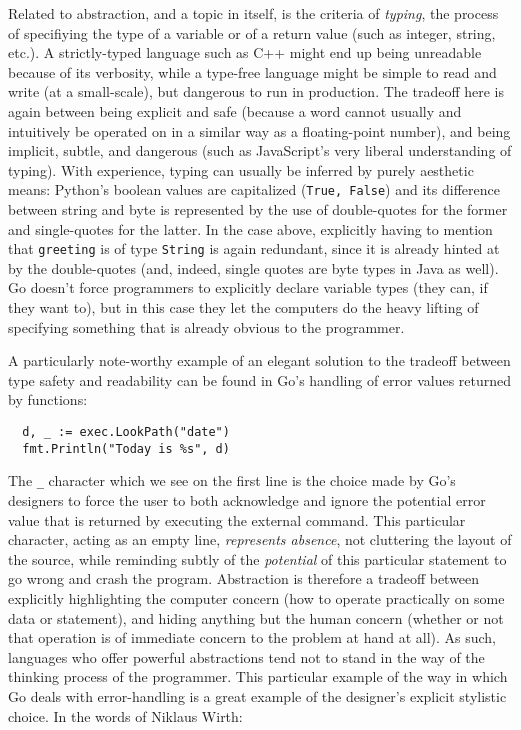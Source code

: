 \documentclass{article}
\begin{document}
Related to abstraction, and a topic in itself, is the criteria of \emph{typing}, the process of specifiying the type of a variable or of a return value (such as integer, string, etc.). A strictly-typed language such as C++ might end up being unreadable because of its verbosity, while a type-free language might be simple to read and write (at a small-scale), but dangerous to run in production. The tradeoff here is again between being explicit and safe (because a word cannot usually and intuitively be operated on in a similar way as a floating-point number), and being implicit, subtle, and dangerous (such as JavaScript's very liberal understanding of typing). With experience, typing can usually be inferred by purely aesthetic means: Python's boolean values are capitalized (\lstinline{True, False}) and its difference between string and byte is represented by the use of double-quotes for the former and single-quotes for the latter. In the case above, explicitly having to mention that \lstinline{greeting} is of type \lstinline{String} is again redundant, since it is already hinted at by the double-quotes (and, indeed, single quotes are byte types in Java as well). Go doesn't force programmers to explicitly declare variable types (they can, if they want to), but in this case they let the computers do the heavy lifting of specifying something that is already obvious to the programmer.

A particularly note-worthy example of an elegant solution to the tradeoff between type safety and readability can be found in Go's handling of error values returned by functions:

\begin{lstlisting}
  d, _ := exec.LookPath("date")
  fmt.Println("Today is %s", d)
\end{lstlisting}

The \lstinline{_} character which we see on the first line is the choice made by Go's designers to force the user to both acknowledge and ignore the potential error value that is returned by executing the external command. This particular character, acting as an empty line, \emph{represents absence}, not cluttering the layout of the source, while reminding subtly of the \emph{potential} of this particular statement to go wrong and crash the program. Abstraction is therefore a tradeoff between explicitly highlighting the computer concern (how to operate practically on some data or statement), and hiding anything but the human concern (whether or not that operation is of immediate concern to the problem at hand at all). As such, languages who offer powerful abstractions tend not to stand in the way of the thinking process of the programmer. This particular example of the way in which Go deals with error-handling is a great example of the designer's explicit stylistic choice. In the words of Niklaus Wirth:
\end{document}
